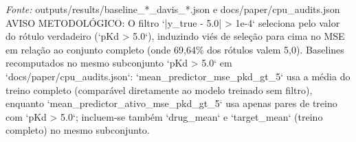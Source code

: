 \begin{table}[htbp]
\begin{flushleft}
\footnotesize \textit{Fonte:} outputs/results/baseline\_*\_davis\_*.json e docs/paper/cpu\_audits.json AVISO METODOLÓGICO: O filtro `|y\_true - 5.0| > 1e-4` seleciona pelo valor do rótulo verdadeiro (`pKd > 5.0`), induzindo viés de seleção para cima no MSE em relação ao conjunto completo (onde 69,64\% dos rótulos valem 5,0). Baselines recomputados no mesmo subconjunto `pKd > 5.0` em `docs/paper/cpu\_audits.json`: `mean\_predictor\_mse\_pkd\_gt\_5` usa a média do treino completo (comparável diretamente ao modelo treinado sem filtro), enquanto `mean\_predictor\_ativo\_mse\_pkd\_gt\_5` usa apenas pares de treino com `pKd > 5.0`; incluem-se também `drug\_mean` e `target\_mean` (treino completo) no mesmo subconjunto.
\end{flushleft}
\end{table}
